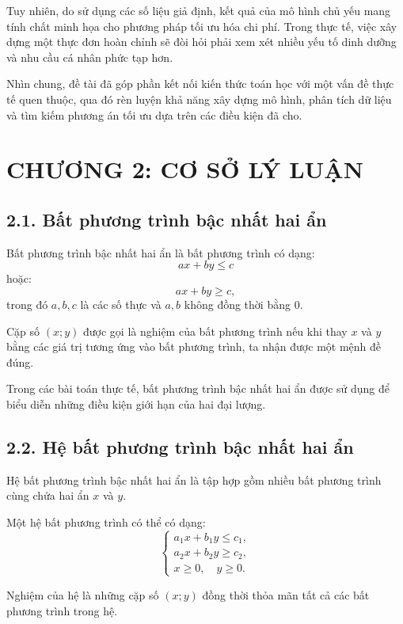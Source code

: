 \documentclass[12pt,a4paper]{article}
\begin{document}
Tuy nhiên, do sử dụng các số liệu giả định, kết quả của mô hình chủ yếu mang tính chất minh họa cho phương pháp tối ưu hóa chi phí. Trong thực tế, việc xây dựng một thực đơn hoàn chỉnh sẽ đòi hỏi phải xem xét nhiều yếu tố dinh dưỡng và nhu cầu cá nhân phức tạp hơn.

Nhìn chung, đề tài đã góp phần kết nối kiến thức toán học với một vấn đề thực tế quen thuộc, qua đó rèn luyện khả năng xây dựng mô hình, phân tích dữ liệu và tìm kiếm phương án tối ưu dựa trên các điều kiện đã cho.

\newpage

\section*{CHƯƠNG 2: CƠ SỞ LÝ LUẬN}

\subsection*{2.1. Bất phương trình bậc nhất hai ẩn}

Bất phương trình bậc nhất hai ẩn là bất phương trình có dạng:
\[
ax+by\leq c
\]
hoặc:
\[
ax+by\geq c,
\]
trong đó $a,b,c$ là các số thực và $a,b$ không đồng thời bằng $0$.

Cặp số $(x;y)$ được gọi là nghiệm của bất phương trình nếu khi thay
$x$ và $y$ bằng các giá trị tương ứng vào bất phương trình, ta nhận được một mệnh đề đúng.

Trong các bài toán thực tế, bất phương trình bậc nhất hai ẩn được sử dụng để biểu diễn những điều kiện giới hạn của hai đại lượng.

\subsection*{2.2. Hệ bất phương trình bậc nhất hai ẩn}

Hệ bất phương trình bậc nhất hai ẩn là tập hợp gồm nhiều bất phương trình cùng chứa hai ẩn $x$ và $y$.

Một hệ bất phương trình có thể có dạng:
\[
\left\{
\begin{array}{l}
a_1x+b_1y\leq c_1,\\
a_2x+b_2y\geq c_2,\\
x\geq0,\quad y\geq0.
\end{array}
\right.
\]

Nghiệm của hệ là những cặp số $(x;y)$ đồng thời thỏa mãn tất cả các bất phương trình trong hệ.
\end{document}
